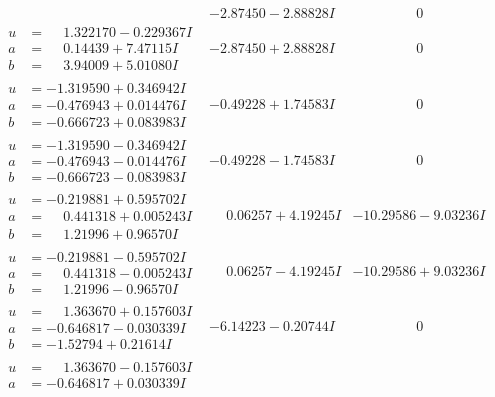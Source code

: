 \documentclass[1p]{elsarticle_modified}
\theoremstyle{definition}
\begin{document}
$$\begin{array}{c|c|c}
 & -2.87450 - 2.88828 I & \phantom{-0.000000 } 0 \\ \hline\begin{aligned}
u &= \phantom{-}1.322170 - 0.229367 I \\
a &= \phantom{-}0.14439 + 7.47115 I \\
b &= \phantom{-}3.94009 + 5.01080 I\end{aligned}
 & -2.87450 + 2.88828 I & \phantom{-0.000000 } 0 \\ \hline\begin{aligned}
u &= -1.319590 + 0.346942 I \\
a &= -0.476943 + 0.014476 I \\
b &= -0.666723 + 0.083983 I\end{aligned}
 & -0.49228 + 1.74583 I & \phantom{-0.000000 } 0 \\ \hline\begin{aligned}
u &= -1.319590 - 0.346942 I \\
a &= -0.476943 - 0.014476 I \\
b &= -0.666723 - 0.083983 I\end{aligned}
 & -0.49228 - 1.74583 I & \phantom{-0.000000 } 0 \\ \hline\begin{aligned}
u &= -0.219881 + 0.595702 I \\
a &= \phantom{-}0.441318 + 0.005243 I \\
b &= \phantom{-}1.21996 + 0.96570 I\end{aligned}
 & \phantom{-}0.06257 + 4.19245 I & -10.29586 - 9.03236 I \\ \hline\begin{aligned}
u &= -0.219881 - 0.595702 I \\
a &= \phantom{-}0.441318 - 0.005243 I \\
b &= \phantom{-}1.21996 - 0.96570 I\end{aligned}
 & \phantom{-}0.06257 - 4.19245 I & -10.29586 + 9.03236 I \\ \hline\begin{aligned}
u &= \phantom{-}1.363670 + 0.157603 I \\
a &= -0.646817 - 0.030339 I \\
b &= -1.52794 + 0.21614 I\end{aligned}
 & -6.14223 - 0.20744 I & \phantom{-0.000000 } 0 \\ \hline\begin{aligned}
u &= \phantom{-}1.363670 - 0.157603 I \\
a &= -0.646817 + 0.030339 I \\

\end{aligned}
\end{array}$$
\end{document}
